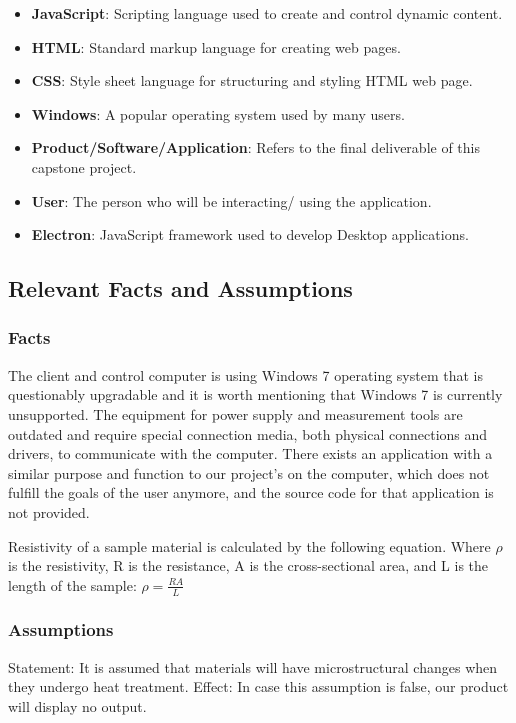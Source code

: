 \documentclass[12pt, titlepage]{article}
\begin{document}
\begin{itemize}
    \item \textbf{JavaScript}: Scripting language used to create and control dynamic content.
    \item \textbf{HTML}: Standard markup language for creating web pages.
    \item \textbf{CSS}: Style sheet language for structuring and styling HTML web page.
    \item \textbf{Windows}: A popular operating system used by many users.
    \item \textbf{Product/Software/Application}: Refers to the final deliverable of this capstone project.
    \item \textbf{User}: The person who will be interacting/ using the application.
    \item \textbf{Electron}: JavaScript framework used to develop Desktop applications.  
\end{itemize}

\subsection{Relevant Facts and Assumptions}
\subsubsection{Facts}
The client and control computer is using Windows 7 operating system that is questionably upgradable and it is worth mentioning that Windows 7 is currently unsupported. The equipment for power supply and measurement tools are outdated and require special connection media, both physical connections and drivers, to communicate with the computer. There exists an application with a similar purpose and function to our project’s on the computer, which does not fulfill the goals of the user anymore, and the source code for that application is not provided.

Resistivity of a sample material is calculated by the following equation. Where $\rho$ is the resistivity, R is the resistance, A is the cross-sectional area, and L is the length of the sample:
$ \rho = \frac{RA}{L} $

\subsubsection{Assumptions}
Statement: It is assumed that materials will have microstructural changes when they undergo heat treatment. 
Effect: In case this assumption is false, our product will display no output. 
\end{document}
